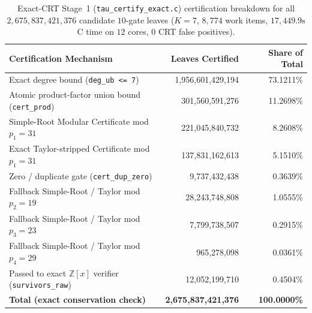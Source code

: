 \documentclass[11pt]{article}
\newcommand{\Z}{\mathbb{Z}}
\newcommand{\code}[1]{\texttt{#1}}
\begin{document}
\begin{table}[ht]
\centering
\small
\caption{Exact-CRT Stage~1 (\code{tau\_certify\_exact.c}) certification breakdown for all $2{,}675{,}837{,}421{,}376$ candidate $10$-gate leaves ($K = 7$, $8{,}774$ work items, $17{,}449.9\text{s}$ C time on $12$ cores, $0$ CRT false positives).}
\label{tab:stage1_tau10}
\begin{tabular}{@{}lrr@{}}
\toprule
Certification Mechanism & Leaves Certified & Share of Total \\
\midrule
Exact degree bound (\code{deg\_ub <= 7}) & 1,956,601,429,194 & 73.1211\% \\
Atomic product-factor union bound (\code{cert\_prod}) & 301,560,591,276 & 11.2698\% \\
Simple-Root Modular Certificate mod $p_1 = 31$ & 221,045,840,732 & 8.2608\% \\
Exact Taylor-stripped Certificate mod $p_1 = 31$ & 137,831,162,613 & 5.1510\% \\
Zero / duplicate gate (\code{cert\_dup\_zero}) & 9,737,432,438 & 0.3639\% \\
Fallback Simple-Root / Taylor mod $p_2 = 19$ & 28,243,748,808 & 1.0555\% \\
Fallback Simple-Root / Taylor mod $p_3 = 23$ & 7,799,738,507 & 0.2915\% \\
Fallback Simple-Root / Taylor mod $p_4 = 29$ & 965,278,098 & 0.0361\% \\
Passed to exact $\Z[x]$ verifier (\code{survivors\_raw}) & 12,052,199,710 & 0.4504\% \\
\midrule
\textbf{Total (exact conservation check)} & \textbf{2,675,837,421,376} & \textbf{100.0000\%} \\
\bottomrule
\end{tabular}
\end{table}
\end{document}
